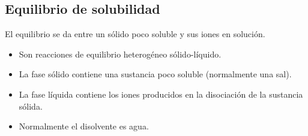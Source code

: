     \subsection{Equilibrio de solubilidad}
    \sangria{} El equilibrio se da entre un sólido poco soluble y sus iones en solución.
    \begin{itemize}
        \item Son reacciones de equilibrio heterogéneo sólido-líquido.
        \item La fase sólido contiene una sustancia poco soluble (normalmente una sal).
        \item La fase líquida contiene los iones producidos en la disociación de la sustancia sólida.
        \item Normalmente el disolvente es agua.
    \end{itemize}
